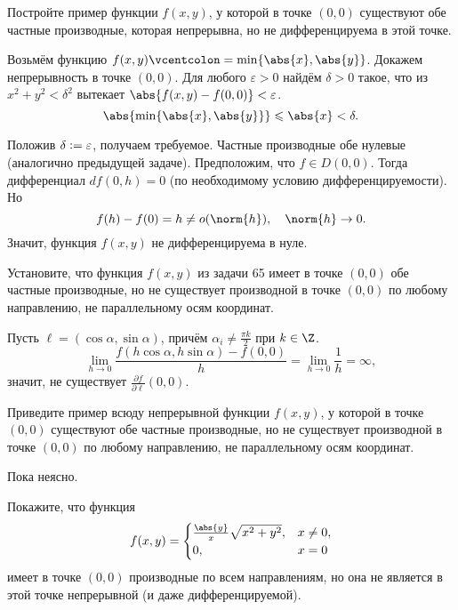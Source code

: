 \begin{problem}[66$^\circ$]
    Постройте пример функции $f(x, y)$, у которой в точке $(0, 0)$ существуют обе частные производные, которая непрерывна, но не дифференцируема в этой точке.
\end{problem}

\begin{solution}
    Возьмём функцию $f(x, y) \vcentcolon = \min\{\abs{x}, \abs{y}\}$. Докажем непрерывность в точке $(0, 0)$. Для любого $\varepsilon > 0$ найдём $\delta > 0$ такое, что из $x^2 + y^2 < \delta^2$ вытекает $\abs{f(x, y) - f(0, 0)} < \varepsilon$.
    \[
        \abs{\min\{\abs{x}, \abs{y}\}} \leqslant \abs{x} < \delta.
    \]

    Положив $\delta \vcentcolon = \varepsilon$, получаем требуемое. Частные производные обе нулевые (аналогично предыдущей задаче). Предположим, что $f \in D(0, 0)$. Тогда дифференциал $df(0, h) = 0$ (по необходимому условию дифференцируемости). Но
    \[
        f(h) - f(0) = h \ne o(\norm{h}),\quad\norm{h} \to 0.
    \]
    Значит, функция $f(x, y)$ не дифференцируема в нуле.
\end{solution}

\begin{problem}[67$^\circ$]
    Установите, что функция $f(x, y)$ из задачи 65 имеет в точке $(0, 0)$ обе частные производные, но не существует производной в точке $(0, 0)$ по любому направлению, не параллельному осям координат.
\end{problem}

\begin{solution}
    Пусть $\ell = (\cos\alpha, \sin\alpha)$, причём $\alpha_i \ne \frac{\pi k}{2}$ при $k \in \Z$.
    \[
        \lim_{h \to 0}\frac{f(h\cos\alpha, h\sin\alpha) - f(0, 0)}{h} = \lim_{h \to 0}\frac{1}{h} = \infty,
    \]
    значит, не существует $\frac{\partial f}{\partial \ell}(0, 0)$.
\end{solution}

\begin{problem}[68]
    Приведите пример всюду непрерывной функции $f(x, y)$, у которой в точке $(0, 0)$ существуют обе частные производные, но не существует производной в точке $(0, 0)$ по любому направлению, не параллельному осям координат.
\end{problem}

\begin{solution}
    Пока неясно.
\end{solution}

\begin{problem}[69]
    Покажите, что функция
    \[
        f(x, y) =
        \begin{cases}
            \frac{\abs{y}}{x}\sqrt{x^2 + y^2},& x \ne 0,\\
            0,& x = 0
        \end{cases}
    \]
    имеет в точке $(0, 0)$ производные по всем направлениям, но она не является в этой точке непрерывной (и даже дифференцируемой).
\end{problem}

